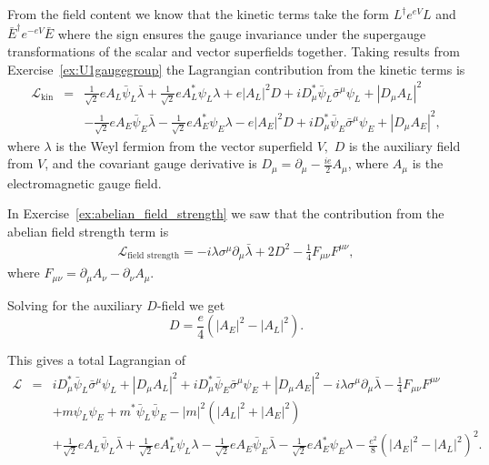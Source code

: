 \documentclass[notes.tex]{subfiles}
\begin{document}
\begin{Answer}
From the field content we know that the kinetic terms take the form $L^\dagger e^{eV}L$ and $\bar E^\dagger e^{-eV}\bar E$ where the sign ensures the gauge invariance under the supergauge transformations of the scalar and vector superfields together. Taking results from Exercise~\ref{ex:U1gaugegroup} the Lagrangian contribution from the kinetic terms is 
\begin{eqnarray}
\mathcal L_\text{kin} &=&
\frac{1}{\sqrt{2}}eA_L\bar\psi_L\bar\lambda + \frac{1}{\sqrt{2}} eA^*_L\psi_L \lambda +e|A_L|^2D +iD_\mu^*\bar\psi_L\bar\sigma^\mu\psi_L+|D_\mu A_L|^2 \nonumber\\
&&-\frac{1}{\sqrt{2}}eA_E\bar\psi_E\bar\lambda - \frac{1}{\sqrt{2}} eA^*_E\psi_E \lambda - e|A_E|^2D +iD_\mu^*\bar\psi_E\bar\sigma^\mu\psi_E+|D_\mu A_E|^2, \nonumber
\end{eqnarray}
where $\lambda$ is the Weyl fermion from the vector superfield $V,$ $D$ is the auxiliary field from $V$, and the covariant gauge derivative is $D_\mu=\partial_\mu-\frac{ie}{2}A_\mu$, where $A_\mu$ is the electromagnetic gauge field.

In Exercise~\ref{ex:abelian_field_strength} we saw that the contribution from the abelian field strength term is
\begin{eqnarray}
\mathcal L_\text{field strength}= -i\lambda\sigma^\mu \partial_\mu \bar\lambda+2D^2-\frac{1}{4}F_{\mu\nu}F^{\mu\nu},
\end{eqnarray}
where $F_{\mu\nu}=\partial_\mu A_\nu-\partial_\nu A_\mu$.

Solving for the auxiliary $D$-field we get
\begin{equation}
D=\frac{e}{4}(|A_E|^2-|A_L|^2).
\end{equation}

This gives a total Lagrangian of
\begin{eqnarray}
\mathcal L &=&  iD_\mu^*\bar\psi_L\bar\sigma^\mu\psi_L+|D_\mu A_L|^2 +iD_\mu^*\bar\psi_E\bar\sigma^\mu\psi_E+|D_\mu A_E|^2 -i\lambda\sigma^\mu \partial_\mu \bar\lambda-\frac{1}{4}F_{\mu\nu}F^{\mu\nu} \nonumber\\
&& +m\psi_L\psi_E+m^*\bar\psi_L\bar\psi_E-|m|^2(|A_L|^2+|A_E|^2) \nonumber \\
&& + \frac{1}{\sqrt{2}}eA_L\bar\psi_L\bar\lambda + \frac{1}{\sqrt{2}} eA^*_L\psi_L \lambda
-\frac{1}{\sqrt{2}}eA_E\bar\psi_E\bar\lambda - \frac{1}{\sqrt{2}} eA^*_E\psi_E \lambda - \frac{e^2}{8}(|A_E|^2-|A_L|^2 )^2.\nonumber
\end{eqnarray}
\end{Answer}
\end{document}
